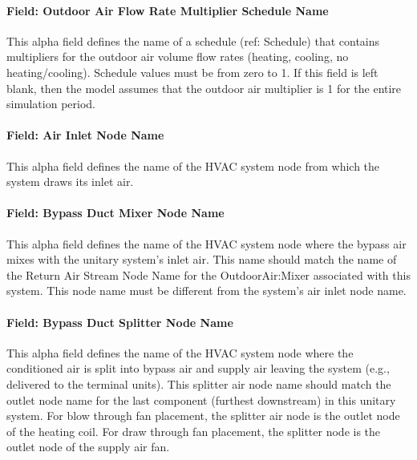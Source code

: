 \paragraph{Field: Outdoor Air Flow Rate Multiplier Schedule Name}\label{field-outdoor-air-flow-rate-multiplier-schedule-name}

This alpha field defines the name of a schedule (ref: Schedule) that contains multipliers for the outdoor air volume flow rates (heating, cooling, no heating/cooling). Schedule values must be from zero to 1. If this field is left blank, then the model assumes that the outdoor air multiplier is 1 for the entire simulation period.

\paragraph{Field: Air Inlet Node Name}\label{field-air-inlet-node-name-3-002}

This alpha field defines the name of the HVAC system node from which the system draws its inlet air.

\paragraph{Field: Bypass Duct Mixer Node Name}\label{field-bypass-duct-mixer-node-name}

This alpha field defines the name of the HVAC system node where the bypass air mixes with the unitary system's inlet air. This name should match the name of the Return Air Stream Node Name for the OutdoorAir:Mixer associated with this system. This node name must be different from the system's air inlet node name.

\paragraph{Field: Bypass Duct Splitter Node Name}\label{field-bypass-duct-splitter-node-name}

This alpha field defines the name of the HVAC system node where the conditioned air is split into bypass air and supply air leaving the system (e.g., delivered to the terminal units). This splitter air node name should match the outlet node name for the last component (furthest downstream) in this unitary system. For blow through fan placement, the splitter air node is the outlet node of the heating coil. For draw through fan placement, the splitter node is the outlet node of the supply air fan.

